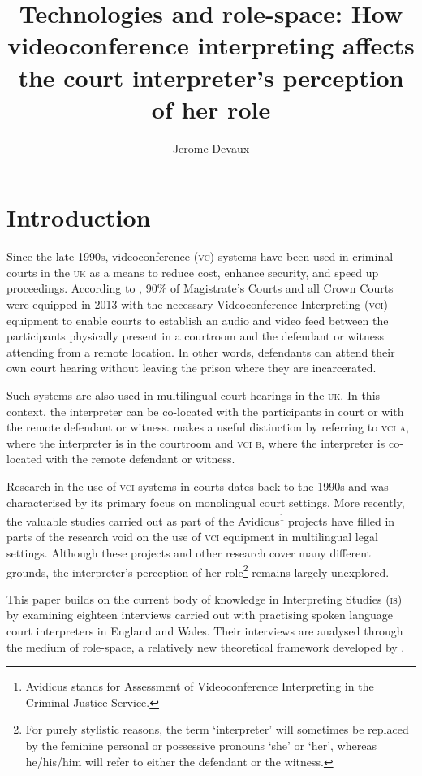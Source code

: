\documentclass[output=paper]{langsci/langscibook}
\author{Jerome Devaux\affiliation{The Open University}}
\title{Technologies and role-space: How videoconference interpreting affects the court interpreter’s perception of her role}
\begin{document}
\section{Introduction}
\label{sec:devaux:1}
Since the late 1990s, videoconference (\textsc{vc}) systems have been used in criminal courts in the \textsc{uk} \citep{Plotnikoff1999, Plotnikoff2000} as a means to reduce cost, enhance security, and speed up proceedings. According to \citep{Braun2016b}, 90\% of Magistrate’s Courts and all Crown Courts were equipped in 2013 with the necessary Videoconference Interpreting (\textsc{vci}) equipment to enable courts to establish an audio and video feed between the participants physically present in a courtroom and the defendant or witness attending from a remote location. In other words, defendants can attend their own court hearing without leaving the prison where they are incarcerated. 

Such systems are also used in multilingual court hearings in the \textsc{uk}. In this context, the interpreter can be co-located with the participants in court or with the remote defendant or witness. \citet{Braun2011a} makes a useful distinction by referring to \textsc{vci} \textsc{a}, where the interpreter is in the courtroom and \textsc{vci b}, where the interpreter is co-located with the remote defendant or witness. 

Research in the use of \textsc{vci} systems in courts dates back to the 1990s and was characterised by its primary focus on monolingual court settings. More recently, the valuable studies carried out as part of the Avidicus\footnote{Avidicus stands for Assessment of Videoconference Interpreting in the Criminal Justice Service.}  projects have filled in parts of the research void on the use of \textsc{vci} equipment in multilingual legal settings. Although these projects and other research cover many different grounds, the interpreter’s perception of her role\footnote{For purely stylistic reasons, the term ‘interpreter’ will sometimes be replaced by the feminine personal or possessive pronouns ‘she’ or ‘her’, whereas he/his/him will refer to either the defendant or the witness.} remains largely unexplored. 

This paper builds on the current body of knowledge in Interpreting Studies (\textsc{is}) by examining eighteen interviews carried out with practising spoken language court interpreters in England and Wales. Their interviews are analysed through the medium of role-space, a relatively new theoretical framework developed by \citet{Llewellyn-Jones2014}.
\end{document}
